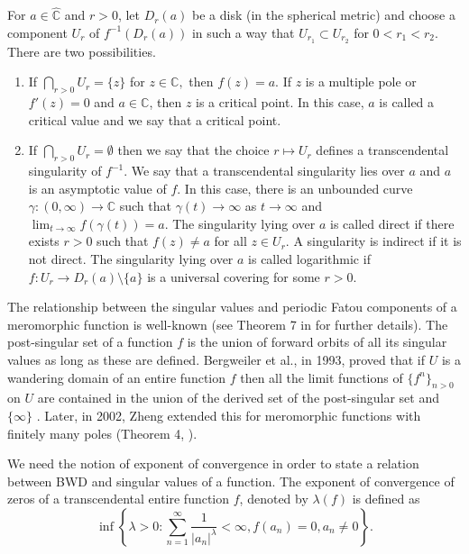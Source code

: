 \documentclass[11pt,a4paper]{article}
\begin{document}
 For $a\in \mathbb{{\widehat{C}}}$ and $r > 0$, let $D_r(a)$ be a disk (in the spherical metric) and choose a component $U_r$ of $f^{-1}(D_{r}(a))$ in such a way that $U_{r_{1}}\subset U_{r_{2}}$ for $0 < r_1 < r_2$. There are two possibilities. 
 \begin{enumerate}
			\item If $\bigcap_{r>0}U_{r}=\{z\}$ for $z\in \mathbb{C},$ then $f(z)=a$.  If $z$ is a multiple pole or  $f'(z)= 0$ and $a\in \mathbb C$, then $z$ is a critical point.
			In this case, $a$
			is called a critical value and we say that a critical point.
			\item If $\bigcap_{r>0}U_{r}=\emptyset$ then we say that the choice $r\mapsto U_r$ defines a transcendental singularity of $f^{-1}$. We say that a transcendental singularity lies over $a$ and $a$ is an asymptotic value of $f$. In this case, there is an unbounded curve $\gamma: (0, \infty) \to \mathbb{C}$ such that $\gamma(t) \to \infty$ as $t \to \infty$ and $\lim_{t \to \infty}f(\gamma(t)) =a$.
			 The singularity lying over $a$ is called direct if there exists $r>0$ such that $f(z)\neq a$ for all $z\in U_r$. A singularity is indirect if it
			is not direct. The singularity lying over $a$ is called logarithmic if $f:U_r\to {D_r(a)\setminus\{a\}}$ is a universal covering for some $r>0$.
	\end{enumerate} 
The relationship between the singular values and periodic Fatou components of a meromorphic function is well-known (see Theorem 7 in \cite{Berg 1993} for further details).  The  post-singular set of a function $f$ is the union of forward orbits of all its singular values as long as these are defined. Bergweiler et al., in 1993, proved that if  $U$ is a wandering domain of an entire function $f$ then all the limit functions of $\{f^n\}_{n>0}$ on $U$ are contained in the union of the derived set of the post-singular set and $\{\infty\}$ \cite{Bergetal 1993}. Later, in 2002, Zheng extended this for meromorphic functions with finitely many poles (Theorem 4, \cite{Zheng 2002}).  
	\par We need the notion of exponent of convergence in order to state a relation between BWD and singular values of a function.  The exponent of convergence of zeros of a transcendental entire function $f$,  denoted by $\lambda(f)$ is defined as \begin{equation}
		\inf\left\{\lambda>0:\sum_{n=1}^{\infty}\frac{1}{|a_n|^\lambda}<\infty, f(a_n)=0,  a_n \neq 0 \right \}.
		\label{exponentofconvergence}\end{equation}  
	
\end{document}
